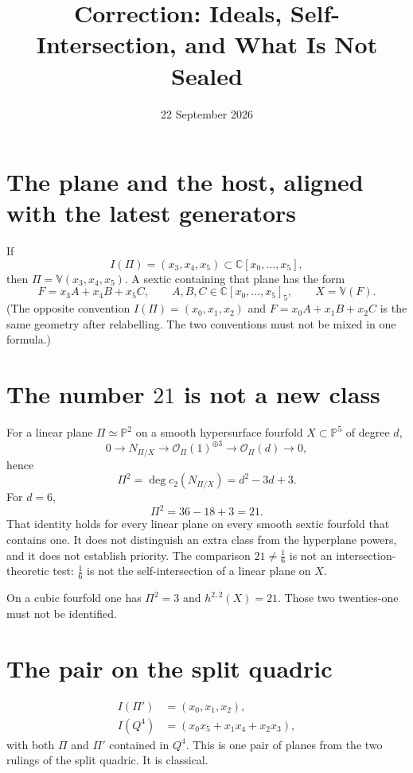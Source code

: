 \documentclass[11pt,a4paper]{article}
\title{Correction: Ideals, Self-Intersection, and What Is Not Sealed}
\date{22 September 2026}
\begin{document}
\maketitle

\section{The plane and the host, aligned with the latest generators}

If
\[
I(\Pi)=(x_3,x_4,x_5)\subset\mathbb{C}[x_0,\ldots,x_5],
\]
then $\Pi=\mathbb{V}(x_3,x_4,x_5)$. A sextic containing that plane has the form
\[
F=x_3A+x_4B+x_5C,\qquad A,B,C\in\mathbb{C}[x_0,\ldots,x_5]_5,\qquad X=\mathbb{V}(F).
\]
(The opposite convention $I(\Pi)=(x_0,x_1,x_2)$ and $F=x_0A+x_1B+x_2C$ is the same geometry after relabelling. The two conventions must not be mixed in one formula.)

\section{The number $21$ is not a new class}

For a linear plane $\Pi\simeq\mathbb{P}^2$ on a smooth hypersurface fourfold $X\subset\mathbb{P}^5$ of degree $d$,
\[
0\to N_{\Pi/X}\to\mathcal{O}_\Pi(1)^{\oplus 3}\to\mathcal{O}_\Pi(d)\to 0,
\]
hence
\[
\Pi^2=\deg c_2(N_{\Pi/X})=d^2-3d+3.
\]
For $d=6$,
\[
\Pi^2=36-18+3=21.
\]
That identity holds for every linear plane on every smooth sextic fourfold that contains one. It does not distinguish an extra class from the hyperplane powers, and it does not establish priority. The comparison $21\neq\tfrac16$ is not an intersection-theoretic test: $\tfrac16$ is not the self-intersection of a linear plane on $X$.

On a cubic fourfold one has $\Pi^2=3$ and $h^{2,2}(X)=21$. Those two twenties-one must not be identified.

\section{The pair on the split quadric}

\[
\begin{aligned}
I(\Pi')&=(x_0,x_1,x_2),\\
I(Q^4)&=(x_0x_5+x_1x_4+x_2x_3),
\end{aligned}
\]
with both $\Pi$ and $\Pi'$ contained in $Q^4$. This is one pair of planes from the two rulings of the split quadric. It is classical.
\end{document}
